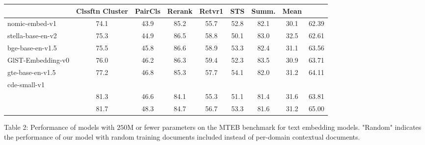 \begin{tabular}{lcccccccc}
\hline & Clssftn Cluster & PairCls & Rerank & Retvr1 & STS & Summ. & Mean \\
\hline nomic-embed-v1 & 74.1 & 43.9 & 85.2 & 55.7 & 52.8 & 82.1 & 30.1 & 62.39 \\
stella-base-en-v2 & 75.3 & 44.9 & 86.5 & 58.8 & 50.1 & 83.0 & 32.5 & 62.61 \\
bge-base-en-v1.5 & 75.5 & 45.8 & 86.6 & 58.9 & 53.3 & 82.4 & 31.1 & 63.56 \\
GlST-Embedding-v0 & 76.0 & 46.2 & 86.3 & 59.4 & 52.3 & 83.5 & 30.9 & 63.71 \\
gte-base-en-v1.5 & 77.2 & 46.8 & 85.3 & 57.7 & 54.1 & 82.0 & 31.2 & 64.11 \\
\hline cde-small-v1 & & & & & & & & \\
[Random] & 81.3 & 46.6 & 84.1 & 55.3 & 51.1 & 81.4 & 31.6 & 63.81 \\
[Contextual] & 81.7 & 48.3 & 84.7 & 56.7 & 53.3 & 81.6 & 31.2 & 65.00 \\
\hline
\end{tabular}
Table 2: Performance of models with \(250 \mathrm{M}\) or fewer parameters on the MTEB benchmark for text embedding models. "Random" indicates the performance of our model with random training documents included instead of per-domain contextual documents.
